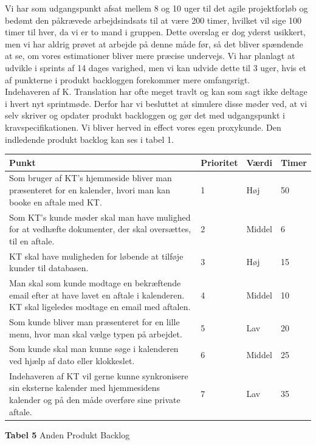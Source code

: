 \documentclass[12pt]{article}   %
\begin{document}
Vi har som udgangspunkt afsat mellem 8 og 10 uger til det agile projektforløb
og bedømt den påkrævede arbejdsindsats til at være 200 timer, hvilket vil sige 100
timer til hver, da vi er to mand i gruppen. Dette overslag er dog yderst
usikkert, men vi har aldrig prøvet at arbejde på denne måde før, så det bliver
spændende at se, om vores estimationer bliver mere præcise undervejs. Vi har
planlagt at udvikle i sprints af 14 dages varighed, men vi kan udvide dette til 3
uger, hvis et af punkterne i produkt backloggen forekommer mere omfangsrigt.\\
Indehaveren af K. Translation har ofte meget travlt og kan som sagt ikke
deltage i hvert nyt sprintmøde. Derfor har vi besluttet at simulere disse
møder ved, at vi selv skriver og opdater produkt backloggen og gør det med
udgangspunkt i kravspecifikationen. Vi bliver herved in effect vores egen 
proxykunde. Den indledende produkt backlog kan ses i tabel 1.

\begin{center}
	\begin{tabular}{|p{8cm}|l|l|l|}
		\hline
Punkt & Prioritet & Værdi & Timer \\ \hline
Som bruger af KT's hjemmeside bliver man præsenteret for en kalender, hvori man
kan booke en aftale med KT. & 1 & Høj &  50 \\ \hline
Som KT's kunde møder skal man have mulighed for at vedhæfte dokumenter, der skal oversættes, til en aftale. & 2 &
Middel & 6  \\ \hline
KT skal have muligheden for løbende at tilføje kunder til databasen. & 3 & Høj
& 15 \\ \hline
Man skal som kunde modtage en bekræftende email efter at have lavet en aftale
i kalenderen. KT skal ligeledes modtage en email med aftalen. & 4 & Middel & 10  \\ \hline
Som kunde bliver man præsenteret for en lille menu, hvor man skal vælge typen
på arbejdet. & 5 & Lav & 20\\ \hline
Som kunde skal man kunne søge i kalenderen ved hjælp af dato eller klokkeslet.
& 6  & Middel &  25 \\ \hline
Indehaveren af KT vil gerne kunne synkronisere sin eksterne kalender med
hjemmesidens kalender og på den måde overføre sine private aftale. & 7 & Lav &
 35 \\ \hline
\end{tabular}
\end{center}
\begin{center}\textbf{Tabel 5} Anden Produkt Backlog
\end{center}
\vspace{0.5cm}
\end{document}
